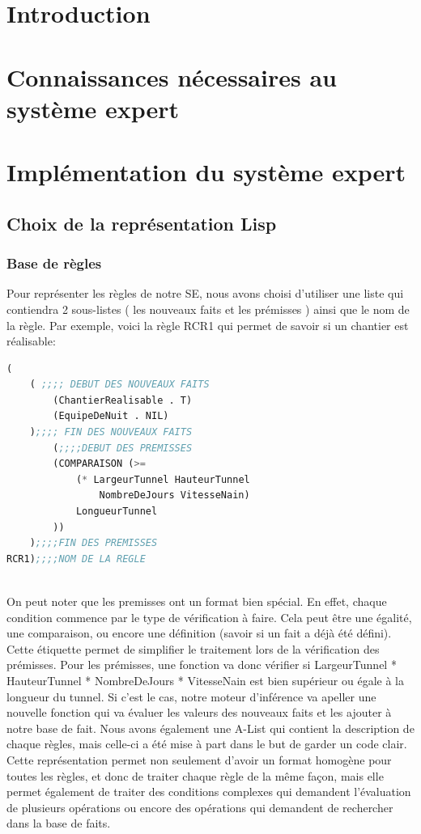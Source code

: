 \documentclass[a4paper,10pt]{report}
\begin{document}
\chapter*{Introduction}
\chapter{Connaissances nécessaires au système expert}
\chapter{Implémentation du système expert}
  \section{Choix de la représentation Lisp}
    \subsection{Base de règles}
    Pour représenter les règles de notre SE, nous avons choisi d'utiliser une liste qui contiendra 2 sous-listes ( les nouveaux faits et les prémisses ) 
    ainsi que le nom de la règle. Par exemple, voici la règle RCR1 qui permet de savoir si un chantier est réalisable:\newline
    \begin{lstlisting}[language=Lisp]
(
	( ;;;; DEBUT DES NOUVEAUX FAITS
		(ChantierRealisable . T)
		(EquipeDeNuit . NIL)
	);;;; FIN DES NOUVEAUX FAITS
		(;;;;DEBUT DES PREMISSES
		(COMPARAISON (>=
			(* LargeurTunnel HauteurTunnel 
			    NombreDeJours VitesseNain)
			LongueurTunnel
		))
	);;;;FIN DES PREMISSES
RCR1);;;;NOM DE LA REGLE
     
    \end{lstlisting}
    
    On peut noter que les premisses ont un format bien spécial. En effet, chaque condition commence par le type de vérification à faire. Cela peut être une égalité,
    une comparaison, ou encore une définition (savoir si un fait a déjà été défini). Cette étiquette permet de simplifier le traitement lors de la vérification
    des prémisses. Pour les prémisses, une fonction va donc vérifier si LargeurTunnel * HauteurTunnel * NombreDeJours * VitesseNain est bien supérieur ou égale à la
    longueur du tunnel. Si c'est le cas, notre moteur d'inférence va apeller une nouvelle fonction qui va évaluer les valeurs des nouveaux faits et les ajouter à
    notre base de fait. Nous avons également une A-List qui contient la description de chaque règles, mais celle-ci a été mise à part dans le but de garder un code
    clair. Cette représentation permet non seulement d'avoir un format homogène pour toutes les règles, et donc de traiter chaque règle de la même façon, mais elle
    permet également de traiter des conditions complexes qui demandent l'évaluation de plusieurs opérations ou encore des opérations qui demandent de rechercher
    dans la base de faits.
\end{document}
